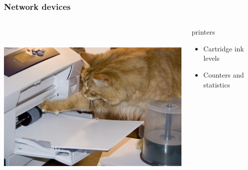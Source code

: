 \documentclass{beamer}
\begin{document}
\begin{frame}

    \frametitle{Network devices}


 \begin{columns}
 \begin{column}{0.15\textwidth}
         \includegraphics[height=8.5cm]{./pics/printer.jpg}
 \end{column}
 \begin{column}{1.25\textwidth}


    \begin{block}{printers}
        \begin{itemize}
            \item Cartridge ink levels
            \item Counters and statistics
        \end{itemize}
    \end{block}

 \end{column}
\end{columns}
\end{frame}
\end{document}
